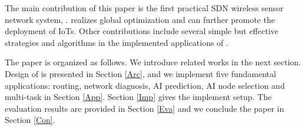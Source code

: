 The main contribution of this paper is the first 
practical SDN wireless sensor network system, {\sdn}. 
{\sdn} realizes global optimization and can further promote the deployment of IoTs.
Other contributions include several simple but effective strategies and algorithms 
in the implemented applications of {\sdn}.


The paper is organized as follows. We introduce related works in the next section. 
Design of {\sdn} is presented in Section \ref{Arc}, 
and we implement five fundamental applications: routing, network diagnosis, 
AI prediction, AI node selection and multi-task in Section \ref{App}. 
Section \ref{Imp} gives the implement setup.
The evaluation results are provided in Section \ref{Eva} 
and we conclude the paper in Section \ref{Con}.